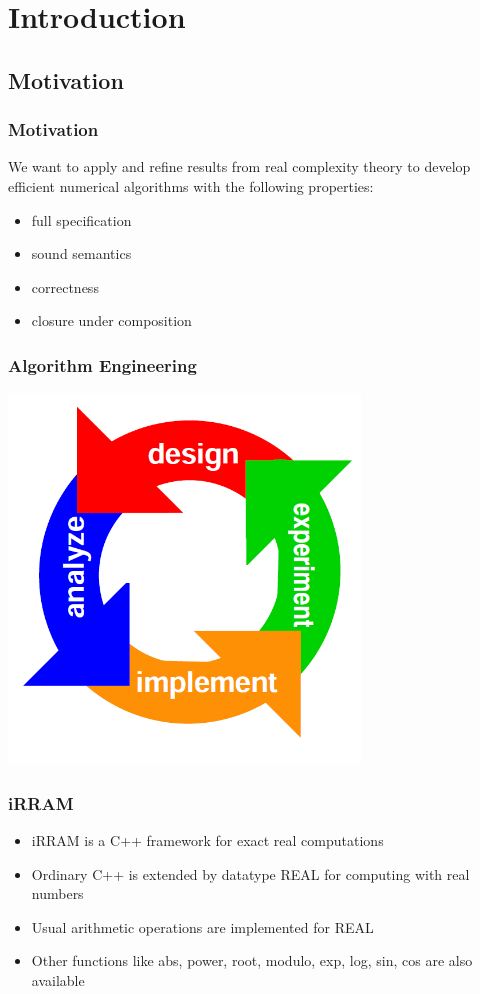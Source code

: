 \section{Introduction}
\subsection{Motivation}
\begin{frame}[<+->]
	\frametitle{Motivation}
	We want to apply and refine results from real complexity theory to develop 
efficient numerical algorithms with the following properties:
\begin{itemize}[<+->]
	\item full specification
	\item sound semantics
	\item correctness
	\item closure under composition
\end{itemize}

\end{frame}
\begin{frame}
	\frametitle{Algorithm Engineering}
	\centering
	\includegraphics[width=0.7\textwidth]{approach.png}
\end{frame}
\begin{frame}[<+->]
\frametitle{iRRAM}
\begin{itemize}[<+->]
\item iRRAM is a C++ framework for exact real computations
\item Ordinary C++ is extended by datatype REAL for computing with real numbers
\item Usual arithmetic operations are implemented for REAL
\item Other functions like abs, power, root, modulo, exp, log, sin, cos are also available
\end{itemize}
\end{frame}
